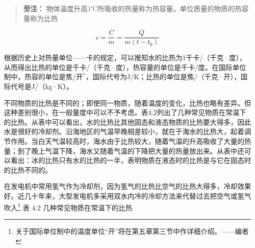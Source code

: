 \begin{quote}
\textbf{旁注：}
物体温度升高1℃所吸收的热量称为热容量。单位质量的物质的热容量称为比热
\end{quote}

\[
c = \frac {C}{m} = \frac {Q}{m (t - t _ {0})} \tag {4.4}
\]

根据历史上对热量单位------卡的规定，可以推知水的比热为1千卡/（千克·度），从而得出比热的单位是千卡/（千克·度），热容量的单位是千卡/度。在国际单位制中，热容的单位是焦/开\(^{*}\)，国际代号为J/K；比热的单位是焦/（千克·开），国际代号是J/（kg·K）。

不同物质的比热是不同的；即使同一物质，随着温度的变化，比热也略有差异。但这种差别很小，在一般量度中可以不予考虑。表4.2列出了几种常见物质在常温下的比热。从表中可以看出，水的比热比其他固态和液态物质的比热要大得多，因此水是很好的冷却剂。沿海地区的气温早晚相差较小，就在于海水的比热大，起着调节作用。当白天气温较高时，海水由于比热较大，随着气温的升高吸收了大量的热量；到了晚上气温下降，海水又随着气温的下降把大量的热量放出来。从表中还可以看出：冰的比热只有水的比热的一半，表明物质在液态时的比热是与它在固态时的比热不同的。

在发电机中常用氢气作为冷却剂，因为氢气的比热比空气的比热大得多，冷却效果好。近几十年来，大型发电机多采用双水内冷的冷却方法来代替过去把空气或氢气吹入\footnote{关于国际单位制中的温度单位``开''将在第五章第三节中作详细介绍。------编者}
表 4.2 几种常见物质在常温下的比热

